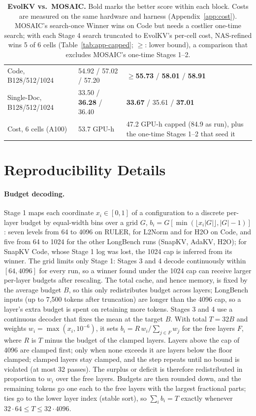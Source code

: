 \begin{table}[t]
\begin{tabular}{@{} p{} p{} p{} @{}}
    Code, B128/512/1024 & 54.92 / 57.02 / 57.20 & \textbf{$\geq$55.73} / \textbf{58.01} / \textbf{58.91} \\
    Single-Doc, B128/512/1024 & 33.50 / \textbf{36.28} / 36.40 & \textbf{33.67} / 35.61 / \textbf{37.01} \\
    Cost, 6 cells (A100) & 53.7 GPU-h & 47.2 GPU-h capped (84.9 as run), plus the one-time Stages 1--2 that seed it \\
    \bottomrule
  \end{tabular}
  \caption{\textbf{EvolKV vs.\ MOSAIC.} Bold marks the better score within each block. Costs are measured on the same hardware and harness (Appendix~\ref{app:cost}). MOSAIC's search-once Winner wins on Code but needs a costlier one-time search; with each Stage 4 search truncated to EvolKV's per-cell cost, NAS-refined wins 5 of 6 cells (Table~\ref{tab:app-capped}; $\geq$: lower bound), a comparison that excludes MOSAIC's one-time Stages 1--2.}
  \label{tab:app-evolkv-glance}
\end{table}


\section{Reproducibility Details}
\label{app:repro}

\paragraph{Budget decoding.} Stage 1 maps each coordinate $x_i \in [0,1]$ of a configuration to a discrete per-layer budget by equal-width bins over a grid $G$, $b_i = G[\min(\lfloor x_i |G| \rfloor, |G|-1)]$: seven levels from 64 to 4096 on RULER, for L2Norm and for H2O on Code, and five from 64 to 1024 for the other LongBench runs (SnapKV, AdaKV, H2O); for SnapKV Code, whose Stage 1 log was lost, the 1024 cap is inferred from its winner. The grid limits only Stage 1: Stages 3 and 4 decode continuously within $[64, 4096]$ for every run, so a winner found under the 1024 cap can receive larger per-layer budgets after rescaling. The total cache, and hence memory, is fixed by the average budget $B$, so this only redistributes budget across layers; LongBench inputs (up to 7{,}500 tokens after truncation) are longer than the 4096 cap, so a layer's extra budget is spent on retaining more tokens. Stages 3 and 4 use a continuous decoder that fixes the mean at the target $B$. With total $T = 32B$ and weights $w_i = \max(x_i, 10^{-6})$, it sets $b_i = R\,w_i / \sum_{j \in F} w_j$ for the free layers $F$, where $R$ is $T$ minus the budget of the clamped layers. Layers above the cap of 4096 are clamped first; only when none exceeds it are layers below the floor clamped; clamped layers stay clamped, and the step repeats until no bound is violated (at most 32 passes). The surplus or deficit is therefore redistributed in proportion to $w_i$ over the free layers. Budgets are then rounded down, and the remaining tokens go one each to the free layers with the largest fractional parts; ties go to the lower layer index (stable sort), so $\sum_i b_i = T$ exactly whenever $32 \cdot 64 \le T \le 32 \cdot 4096$.

